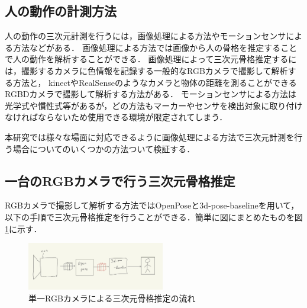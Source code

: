 \documentclass[titlepage]{jarticle}
\begin{document}
\subsection{人の動作の計測方法}
%
人の動作の三次元計測を行うには，画像処理による方法やモーションセンサによる方法などがある．
画像処理による方法では画像から人の骨格を推定することで人の動作を解析することができる．
画像処理によって三次元骨格推定するには，撮影するカメラに色情報を記録する一般的なRGBカメラで撮影して解析する方法と，
kinectやRealSenseのようなカメラと物体の距離を測ることができるRGBDカメラで撮影して解析する方法がある．
モーションセンサによる方法は光学式や慣性式等があるが，どの方法もマーカーやセンサを検出対象に取り付けなければならないため使用できる環境が限定されてしまう．

本研究では様々な場面に対応できるように画像処理による方法で三次元計測を行う場合についてのいくつかの方法ついて検証する．

%
%
\subsection{一台のRGBカメラで行う三次元骨格推定}
%
RGBカメラで撮影して解析する方法ではOpenPose\cite{openpose}と3d-pose-baseline\cite{baseline}を用いて，
以下の手順で三次元骨格推定を行う\cite{ビデオ}ことができる．簡単に図にまとめたものを図\ref{RGB}に示す．

\begin{figure}[h!]
  \centering
  \includegraphics[width=6cm]{img/RGBcamera.jpg}
  \caption{単一RGBカメラによる三次元骨格推定の流れ}
  \label{RGB}
\end{figure}
\end{document}
